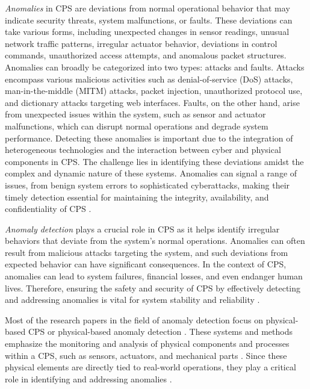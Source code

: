 \emph{Anomalies} in CPS are deviations from normal operational behavior that may indicate security threats, system malfunctions, or faults. These deviations can take various forms, including unexpected changes in sensor readings, unusual network traffic patterns, irregular actuator behavior, deviations in control commands, unauthorized access attempts, and anomalous packet structures. Anomalies can broadly be categorized into two types: attacks and faults. Attacks encompass various malicious activities such as denial-of-service (DoS) attacks, man-in-the-middle (MITM) attacks, packet injection, unauthorized protocol use, and dictionary attacks targeting web interfaces. Faults, on the other hand, arise from unexpected issues within the system, such as sensor and actuator malfunctions, which can disrupt normal operations and degrade system performance. Detecting these anomalies is important due to the integration of heterogeneous technologies and the interaction between cyber and physical components in CPS. The challenge lies in identifying these deviations amidst the complex and dynamic nature of these systems. Anomalies can signal a range of issues, from benign system errors to sophisticated cyberattacks, making their timely detection essential for maintaining the integrity, availability, and confidentiality of CPS \cite{116, 16, 128,129,130,131,132,133,134,135,136}.

\emph{Anomaly detection} plays a crucial role in CPS as it helps identify irregular behaviors that deviate from the system's normal operations. Anomalies can often result from malicious attacks targeting the system, and such deviations from expected behavior can have significant consequences. In the context of CPS, anomalies can lead to system failures, financial losses, and even endanger human lives. Therefore, ensuring the safety and security of CPS by effectively detecting and addressing anomalies is vital for system stability and reliability \cite{137,138}.

Most of the research papers in the field of anomaly detection focus on physical-based CPS or physical-based anomaly detection \cite{139}. These systems and methods emphasize the monitoring and analysis of physical components and processes within a CPS, such as sensors, actuators, and mechanical parts \cite{140}. Since these physical elements are directly tied to real-world operations, they play a critical role in identifying and addressing anomalies \cite{141}.

